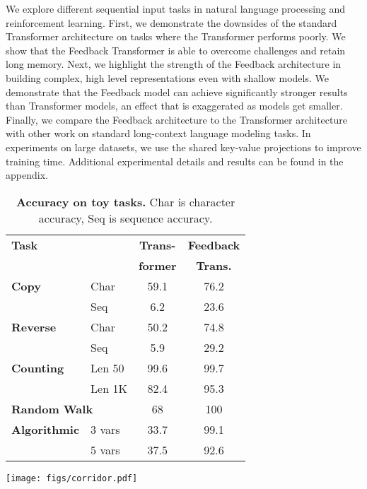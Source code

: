 \documentclass{article} \usepackage{iclr2021_conference}
\begin{document}
We explore different sequential input tasks in natural language processing and reinforcement learning. First, we demonstrate the downsides of the standard Transformer architecture on tasks where the Transformer performs poorly. We show that the Feedback Transformer is able to overcome challenges and retain long memory. Next, we highlight the strength of the Feedback architecture in building complex, high level representations even with shallow models. We demonstrate that the Feedback model can achieve significantly stronger results than Transformer models, an effect that is exaggerated as models get smaller. Finally, we compare the Feedback architecture to the Transformer architecture with other work on standard long-context language modeling tasks. In experiments on large datasets, we use the shared key-value projections to improve training time. Additional experimental details and results can be found in the appendix.

\begin{table}
	\centering
	\begin{minipage}{.45\textwidth}
	    \centering
\begin{tabular}[t]{llcc}
			\toprule
			\multicolumn{2}{l}{\bf Task} & \bf Trans- & \bf Feedback \\
			&  & \bf former & \bf Trans. \\
			\midrule
			\bf Copy & Char & 59.1 & 76.2 \\
			     & Seq & 6.2 & 23.6 \\
			 \midrule
			\bf Reverse & Char & 50.2 & 74.8 \\
			        & Seq & 5.9 & 29.2 \\
			\midrule
			\bf Counting & Len 50 & 99.6 & 99.7 \\
			& Len 1K & 82.4 & 95.3 \\
			\midrule
			\multicolumn{2}{l}{\bf Random Walk} & 68 & 100 \\
			\midrule
			\bf Algorithmic  & 3 vars & 33.7 & 99.1 \\
			 & 5 vars & 37.5 & 92.6 \\
			\bottomrule
		\end{tabular}		
	    \caption{
	    \textbf{Accuracy on toy tasks.} Char is character accuracy, Seq is sequence accuracy.}  
	    \label{tab:toy_tasks}
	\end{minipage}
	\hfill
	\begin{minipage}{.45\textwidth}
		\centering
		\texttt{[image: figs/corridor.pdf]}
		\label{fig:corridor_result}
	\end{minipage}

\end{table}
\end{document}
